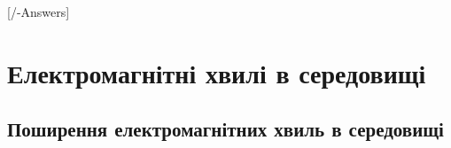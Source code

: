 
[\currfilebase/\currfilebase-Answers]
\chapter{Електромагнітні хвилі в середовищі}\label{\currfilebase}





\section{Поширення електромагнітних хвиль в середовищі}





